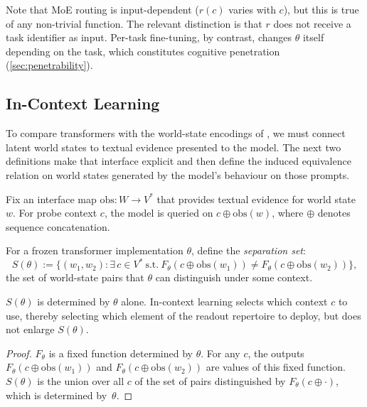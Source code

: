 \documentclass[twoside,11pt]{article}
\begin{document}
Note that MoE routing is input-dependent ($r(c)$ varies with $c$), but this is true of any non-trivial function. The relevant distinction is that $r$ does not receive a task identifier as input. Per-task fine-tuning, by contrast, changes $\theta$ itself depending on the task, which constitutes cognitive penetration (\cref{sec:penetrability}).

\subsection{In-Context Learning}

To compare transformers with the world-state encodings of \citet{dallariva_2026}, we must connect latent world states to textual evidence presented to the model. The next two definitions make that interface explicit and then define the induced equivalence relation on world states generated by the model's behaviour on those prompts.

\begin{definition}
Fix an interface map $\mathrm{obs} \colon W \to V^*$ that provides textual evidence for world state $w$. For probe context $c$, the model is queried on $c \oplus \mathrm{obs}(w)$, where $\oplus$ denotes sequence concatenation.
\end{definition}

\begin{definition}\label{def:repertoire}
For a frozen transformer implementation $\theta$, define the \emph{separation set}:
\[
S(\theta) := \{(w_1, w_2) : \exists\, c \in V^*\ \text{s.t.}\ F_\theta(c \oplus \mathrm{obs}(w_1)) \neq F_\theta(c \oplus \mathrm{obs}(w_2))\},
\]
the set of world-state pairs that $\theta$ can distinguish under some context.
\end{definition}

\begin{proposition}\label{prop:icl-bound}
$S(\theta)$ is determined by $\theta$ alone. In-context learning selects which context $c$ to use, thereby selecting which element of the readout repertoire to deploy, but does not enlarge $S(\theta)$.
\end{proposition}

\begin{proof}
$F_\theta$ is a fixed function determined by $\theta$. For any $c$, the outputs $F_\theta(c \oplus \mathrm{obs}(w_1))$ and $F_\theta(c \oplus \mathrm{obs}(w_2))$ are values of this fixed function. $S(\theta)$ is the union over all $c$ of the set of pairs distinguished by $F_\theta(c \oplus \cdot)$, which is determined by~$\theta$.
\end{proof}
\end{document}
